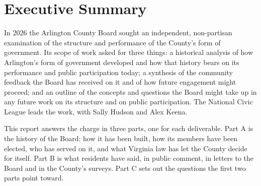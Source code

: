 \clearpage
\section*{Executive Summary}

In 2026 the Arlington County Board sought an independent, non-partisan
examination of the structure and performance of the County's form of
government. Its scope of work\autocite{arlingtoncounty2026scopeofwork} asked
for three things: a historical analysis of how Arlington's form of government
developed and how that history bears on its performance and public
participation today; a synthesis of the community feedback the Board has
received on it and of how future engagement might proceed; and an outline of
the concepts and questions the Board might take up in any future work on its
structure and on public participation. The National Civic League leads the
work, with Sally Hudson and Alex Keena.

This report answers the charge in three parts, one for each deliverable. Part A
is the history of the Board: how it has been built, how its members have been
elected, who has served on it, and what Virginia law has let the County decide
for itself. Part B is what residents have said, in public comment, in letters to
the Board and in the County's surveys. Part C sets out the questions the first
two parts point toward.

